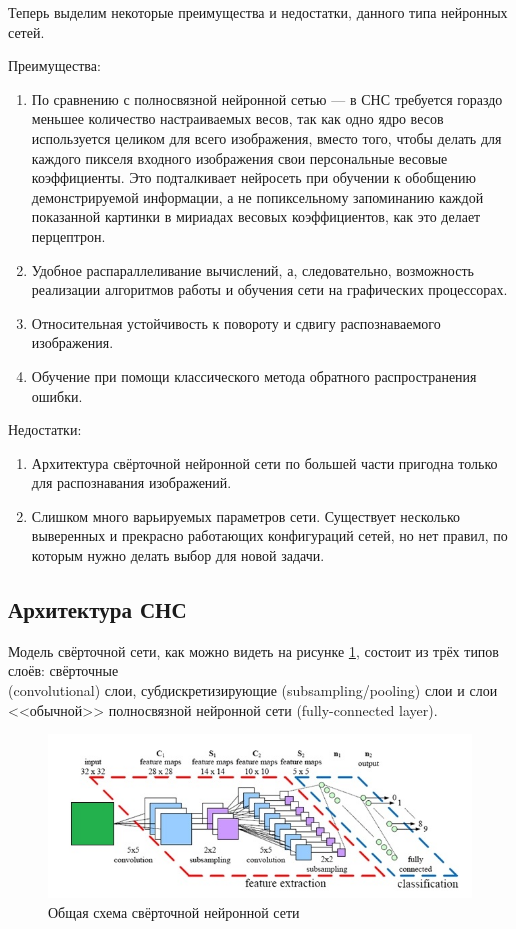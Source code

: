 \documentclass[14pt]{article}
\numberwithin{figure}{section}
\numberwithin{equation}{section}
\begin{document}
Теперь выделим некоторые преимущества и недостатки, данного типа нейронных сетей.

Преимущества:
\begin{enumerate}
	\item
	По сравнению с полносвязной нейронной сетью — в СНС требуется гораздо меньшее количество настраиваемых весов, так как одно ядро весов используется целиком для всего изображения, вместо того, чтобы делать для каждого пикселя входного изображения свои персональные весовые коэффициенты. Это подталкивает нейросеть при обучении к обобщению демонстрируемой информации, а не попиксельному запоминанию каждой показанной картинки в мириадах весовых коэффициентов, как это делает перцептрон.
	\item
	Удобное распараллеливание вычислений, а, следовательно, возможность реализации алгоритмов работы и обучения сети на графических процессорах.
	\item
	Относительная устойчивость к повороту и сдвигу распознаваемого изображения.
	\item
	Обучение при помощи классического метода обратного распространения ошибки.
\end{enumerate}

Недостатки:
\begin{enumerate}
	\item
	Архитектура свёрточной нейронной сети по большей части пригодна только для распознавания изображений.
	\item
	Слишком много варьируемых параметров сети. Существует несколько выверенных и прекрасно работающих конфигураций сетей, но нет правил, по которым нужно делать выбор для новой задачи.
\end{enumerate}

\subsection{Архитектура СНС}

Модель свёрточной сети, как можно видеть на рисунке \ref{ris:6}, состоит из трёх типов слоёв: свёрточные \\ (convolutional) слои, субдискретизирующие (subsampling/pooling) слои и слои <<обычной>> полносвязной нейронной сети (fully-connected layer).

\begin{figure}[h]
	\begin{center}
		\includegraphics[scale=0.99] {6.JPG}
		\caption{Общая схема свёрточной нейронной сети}
		\label{ris:6}
	\end{center}
\end{figure}
\end{document}
